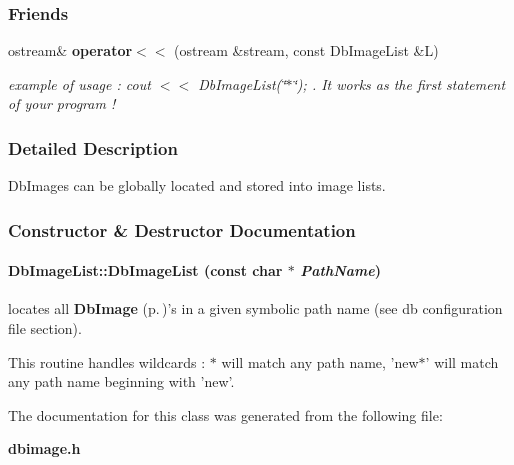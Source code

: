 \subsubsection*{Friends}
\begin{CompactItemize}
\item 
{}
ostream\& {\bf operator$<$$<$} (ostream \&stream, const Db\-Image\-List \&L)\label{class_dbimagelist_l0}

\begin{CompactList}\small\item\em example of usage : cout $<$$<$ Db\-Image\-List(\char`\"{}$\ast$\char`\"{}); . It works as the first statement of your program !\item\end{CompactList}\end{CompactItemize}


\subsubsection{Detailed Description}
Db\-Images can be globally located and stored into image lists.



\subsubsection{Constructor \& Destructor Documentation}
\paragraph{\setlength{\rightskip}{0pt plus 5cm}Db\-Image\-List::Db\-Image\-List (const char $\ast$ {\em Path\-Name})}\hfill\label{class_dbimagelist_a0}


locates all {\bf Db\-Image} {\rm (p.\,\pageref{class_dbimage})}'s in a given symbolic path name (see db configuration file section).

This routine handles wildcards : $\ast$ will match any path name, 'new$\ast$' will match any path name beginning with 'new'. 

The documentation for this class was generated from the following file:\begin{CompactItemize}
\item 
{\bf dbimage.h}\end{CompactItemize}
